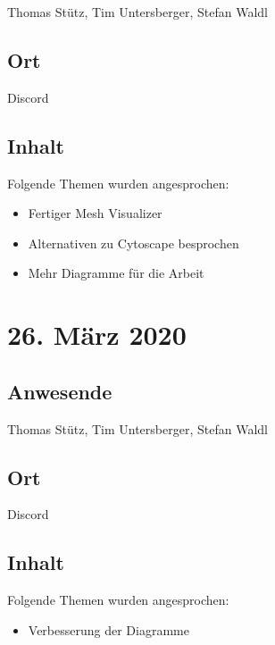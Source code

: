 Thomas Stütz, Tim Untersberger, Stefan Waldl

\subsection*{Ort}

Discord

\subsection*{Inhalt}

Folgende Themen wurden angesprochen:

\begin{itemize}
  \item Fertiger Mesh Visualizer
  \item Alternativen zu Cytoscape besprochen
  \item Mehr Diagramme für die Arbeit
\end{itemize}

\pagebreak

\section*{26. März 2020}

\subsection*{Anwesende}

Thomas Stütz, Tim Untersberger, Stefan Waldl

\subsection*{Ort}

Discord

\subsection*{Inhalt}

Folgende Themen wurden angesprochen:

\begin{itemize}
  \item Verbesserung der Diagramme
\end{itemize}

\pagebreak